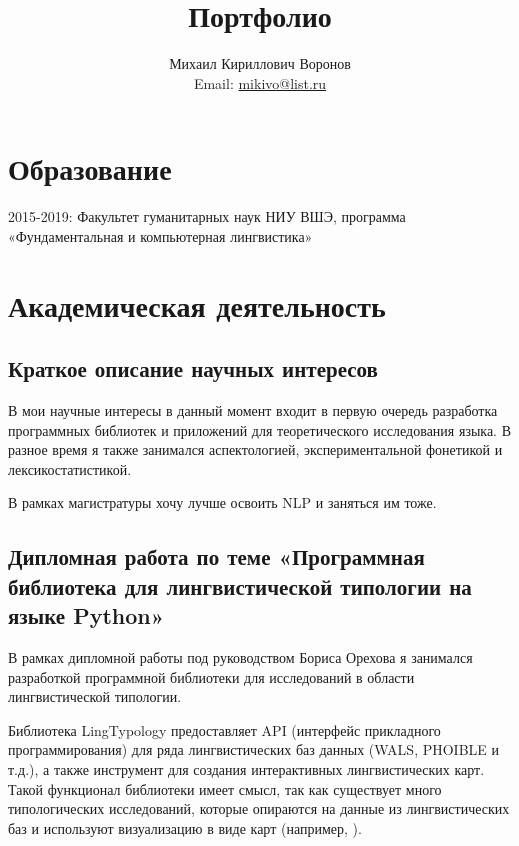 \documentclass[a4paper,10pt]{article}
\title{Портфолио}
\author{Михаил Кириллович Воронов \\ Email: \href{mailto:mikivo@list.ru}{mikivo@list.ru}}
\begin{document}
\maketitle

\pagebreak

\tableofcontents

\newpage

\section{Образование}

2015-2019: Факультет гуманитарных наук НИУ ВШЭ, программа «Фундаментальная и компьютерная лингвистика»

\section{Академическая деятельность}

\subsection{Краткое описание научных интересов}

В мои научные интересы в данный момент входит в первую очередь разработка программных библиотек и приложений для теоретического исследования языка. В разное время я также занимался аспектологией, экспериментальной фонетикой и лексикостатистикой.

В рамках магистратуры хочу лучше освоить NLP и заняться им тоже.

\subsection{Дипломная работа по теме «Программная библиотека для лингвистической типологии на языке Python»}

В рамках дипломной работы под руководством Бориса Орехова я занимался разработкой программной библиотеки для исследований в области лингвистической типологии.

Библиотека LingTypology предоставляет API (интерфейс прикладного программирования) для ряда лингвистических баз данных (WALS, PHOIBLE и т.д.), а также инструмент для создания интерактивных лингвистических карт. Такой функционал библиотеки имеет смысл, так как существует много типологических исследований, которые опираются на данные из лингвистических баз и используют визуализацию в виде карт (например, \parencite{Blasieaav3218}).
\end{document}
